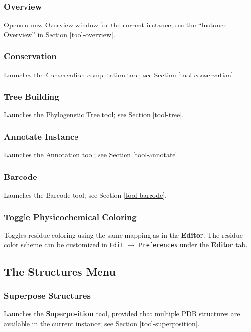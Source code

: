 \documentclass[a4paper]{article}
\begin{document}
\subsubsection{Overview}
Opens a new Overview window for the current instance; see the ``Instance Overview'' in Section \ref{tool-overview}.

\subsubsection{Conservation}
Launches the Conservation computation tool; see Section \ref{tool-conservation}.

\subsubsection{Tree Building}
Launches the Phylogenetic Tree tool; see Section \ref{tool-tree}.

\subsubsection{Annotate Instance}
Launches the Annotation tool; see Section \ref{tool-annotate}.

\subsubsection{Barcode}
Launches the Barcode tool; see Section \ref{tool-barcode}.

\subsubsection{Toggle Physicochemical Coloring}
Toggles residue coloring using the same mapping as in the \textbf{Editor}. The residue color scheme can be customized in \texttt{Edit} $\rightarrow$ \texttt{Preferences} under the \textbf{Editor} tab.


\subsection{The Structures Menu}

\subsubsection{Superpose Structures}
Launches the \textbf{Superposition} tool, provided that multiple PDB structures are available in the current instance; see Section \ref{tool-superposition}.
\end{document}
